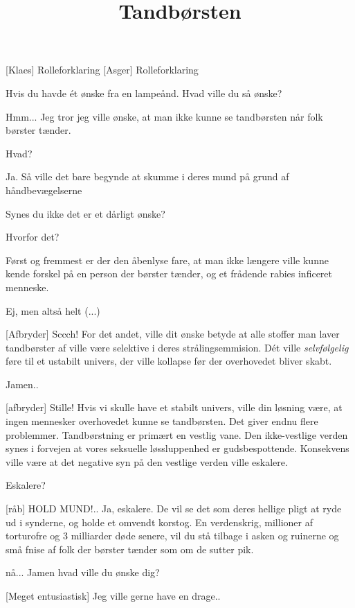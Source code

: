 \documentclass[a4paper,11pt]{article}
\title{Tandbørsten}
\begin{document}
\maketitle

\begin{roles}
    [Klaes] Rolleforklaring
    [Asger] Rolleforklaring
\end{roles}

\begin{sketch}


 Hvis du havde ét ønske fra en lampeånd. Hvad ville du så ønske?

 Hmm...  Jeg tror jeg ville ønske, at man ikke kunne se tandbørsten når folk børster tænder.

 Hvad?

 Ja. Så ville det bare begynde at skumme i deres mund på grund af håndbevægelserne 

 Synes du ikke det er et dårligt ønske?

 Hvorfor det?

 Først og fremmest er der den åbenlyse fare, at man ikke længere ville kunne kende forskel på en person der børster tænder, og et frådende rabies inficeret menneske.

 Ej, men altså helt (...)

[Afbryder] Sccch! For det andet, ville dit ønske betyde at alle stoffer man laver tandbørster af ville være selektive i deres strålingsemmision. Dét ville \emph{selvfølgelig} føre til et ustabilt univers, der ville kollapse før der overhovedet bliver skabt. 

 Jamen..

[afbryder] Stille! Hvis vi skulle have et stabilt univers, ville din løsning være, at ingen mennesker overhovedet kunne se tandbørsten. Det giver endnu flere problemmer. Tandbørstning er primært en vestlig vane. Den ikke-vestlige verden synes i forvejen at vores seksuelle løssluppenhed er gudsbespottende. Konsekvens ville være at det negative syn på den vestlige verden ville eskalere.

 Eskalere?

[råb] HOLD MUND!.. Ja, eskalere. De vil se det som deres hellige pligt at ryde ud i synderne, og  holde et omvendt korstog. En verdenskrig, millioner af torturofre og 3 milliarder døde senere, vil du stå tilbage i asken og ruinerne og små fnise af folk der børster tænder som om de sutter pik.

  nå... Jamen hvad ville du ønske dig?

 [Meget entusiastisk] Jeg ville gerne have en drage..


\end{sketch}
\end{document}
